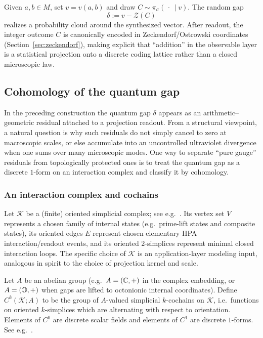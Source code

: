 Given $a,b\in M$, set $v=v(a,b)$ and draw $C\sim \pi_\sigma(\,\cdot\,\mid v)$. The random gap
$$
\delta:=v-\mathcal{Z}(C)
$$
realizes a probability cloud around the synthesized vector. After readout, the integer outcome $C$ is canonically encoded in Zeckendorf/Ostrowski coordinates (Section~\ref{sec:zeckendorf}), making explicit that ``addition'' in the observable layer is a statistical projection onto a discrete coding lattice rather than a closed microscopic law.

\subsection{Cohomology of the quantum gap}
\label{subsec:gap_cohomology}
In the preceding construction the quantum gap $\delta$ appears as an arithmetic--geometric residual attached to a projection readout.
From a structural viewpoint, a natural question is why such residuals do not simply cancel to zero at macroscopic scales, or else accumulate into an uncontrolled ultraviolet divergence when one sums over many microscopic modes.
One way to separate ``pure gauge'' residuals from topologically protected ones is to treat the quantum gap as a discrete $1$-form on an interaction complex and classify it by cohomology.

\subsubsection{An interaction complex and cochains}
\begin{definition}
\label{def:hpa_interaction_complex}
Let $\mathcal{K}$ be a (finite) oriented simplicial complex; see e.g.~\cite{Hatcher2002}.
Its vertex set $V$ represents a chosen family of internal states (e.g.\ prime-lift states and composite states), its oriented edges $E$ represent chosen elementary HPA interaction/readout events, and its oriented $2$-simplices represent minimal closed interaction loops.
The specific choice of $\mathcal{K}$ is an application-layer modeling input, analogous in spirit to the choice of projection kernel and scale.
\end{definition}

\begin{definition}
\label{def:cochains_discrete_forms}
Let $A$ be an abelian group (e.g.\ $A=(\mathbb{C},+)$ in the complex embedding, or $A=(\mathbb{O},+)$ when gaps are lifted to octonionic internal coordinates).
Define
$
C^k(\mathcal{K};A)
$
to be the group of $A$-valued simplicial $k$-cochains on $\mathcal{K}$, i.e.\ functions on oriented $k$-simplices which are alternating with respect to orientation.
Elements of $C^0$ are discrete scalar fields and elements of $C^1$ are discrete $1$-forms.
See e.g.~\cite{Hatcher2002,DesbrunHiraniLeokMarsden2005DEC}.
\end{definition}

